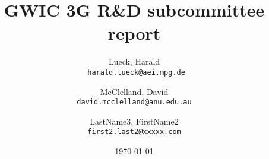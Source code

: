 \documentclass[url,11pt]{article}
\def\biblio{}
\begin{document}
\dosecttoc

\def\biblio{} %
\togglefalse{standalone}


\title{GWIC 3G R\&D subcommittee report }

\author{
  Lueck, Harald\\
  \texttt{
  harald.lueck@aei.mpg.de}
  \and
  McClelland, David\\
  \texttt{david.mcclelland@anu.edu.au}
  \and
  LastName3, FirstName2\\
  \texttt{first2.last2@xxxxx.com}
}

\date{\today}
\maketitle
\tableofcontents
\pagebreak



\clearpage


\clearpage


\clearpage


\clearpage


\clearpage

\clearpage

\clearpage

\clearpage

\clearpage


\clearpage

\clearpage

\clearpage

\clearpage



\clearpage
{}
\appendix




\clearpage
{}





%
%
\end{document}
